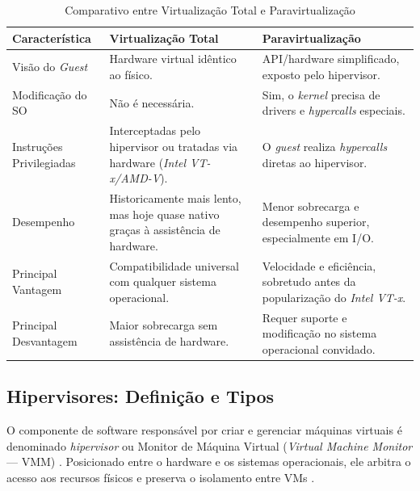 \begin{table}[htb]
    \centering
    \caption{Comparativo entre Virtualização Total e Paravirtualização}
    \label{tab:comparativo_virtualizacao}
    \begin{tabularx}{\textwidth}{ l >{\RaggedRight}X >{\RaggedRight}X }
        \toprule
        \textbf{Característica} & \textbf{Virtualização Total} & \textbf{Paravirtualização} \\
        \midrule
        Visão do \textit{Guest} & Hardware virtual idêntico ao físico. & API/hardware simplificado, exposto pelo hipervisor. \\
        \addlinespace
        Modificação do SO & Não é necessária. & Sim, o \textit{kernel} precisa de drivers e \textit{hypercalls} especiais. \\
        \addlinespace
        Instruções Privilegiadas & Interceptadas pelo hipervisor ou tratadas via hardware (\textit{Intel VT-x/AMD-V}). & O \textit{guest} realiza \textit{hypercalls} diretas ao hipervisor. \\
        \addlinespace
        Desempenho & Historicamente mais lento, mas hoje quase nativo graças à assistência de hardware. & Menor sobrecarga e desempenho superior, especialmente em I/O. \\
        \addlinespace
        Principal Vantagem & Compatibilidade universal com qualquer sistema operacional. & Velocidade e eficiência, sobretudo antes da popularização do \textit{Intel VT-x}. \\
        \addlinespace
        Principal Desvantagem & Maior sobrecarga sem assistência de hardware. & Requer suporte e modificação no sistema operacional convidado. \\
        \bottomrule
    \end{tabularx}
\end{table}

\subsection{Hipervisores: Definição e Tipos}

O componente de software responsável por criar e gerenciar máquinas virtuais é denominado \textit{hipervisor} ou Monitor de Máquina Virtual (\textit{Virtual Machine Monitor} — VMM) \cite{chawla2025, carissimi2008}. Posicionado entre o hardware e os sistemas operacionais, ele arbitra o acesso aos recursos físicos e preserva o isolamento entre VMs \cite{chawla2025}.

